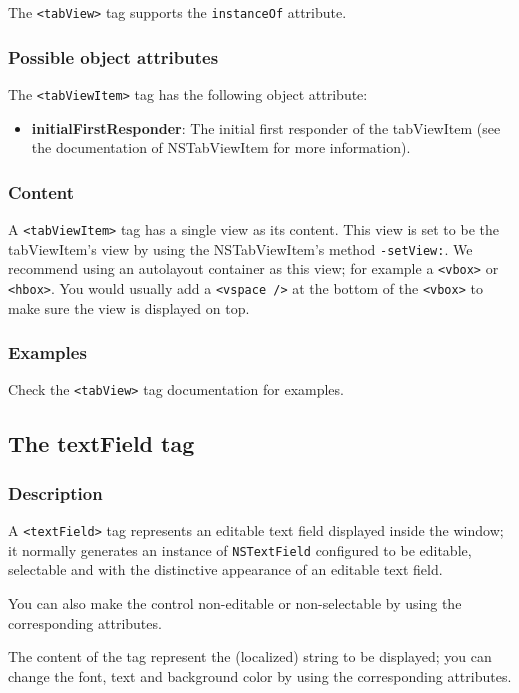 The \texttt{<tabView>} tag supports the \texttt{instanceOf} attribute.

\subsubsection{Possible object attributes}
The \texttt{<tabViewItem>} tag has the following object attribute:
\begin{itemize}
\item {\bf initialFirstResponder}: The initial first responder of the
  tabViewItem (see the documentation of NSTabViewItem for more
  information).
\end{itemize}

\subsubsection{Content}
A \texttt{<tabViewItem>} tag has a single view as its content.  This
view is set to be the tabViewItem's view by using the NSTabViewItem's
method \texttt{-setView:}.  We recommend using an autolayout container
as this view; for example a \texttt{<vbox>} or \texttt{<hbox>}.  You
would usually add a \texttt{<vspace />} at the bottom of the
\texttt{<vbox>} to make sure the view is displayed on top.

\subsubsection{Examples}
Check the \texttt{<tabView>} tag documentation for examples.

\subsection{The textField tag}

\subsubsection{Description}
A \texttt{<textField>} tag represents an editable text field displayed
inside the window; it normally generates an instance of
\texttt{NSTextField} configured to be editable, selectable and with
the distinctive appearance of an editable text field.

You can also make the control non-editable or non-selectable by using
the corresponding attributes.

The content of the tag represent the (localized) string to be
displayed; you can change the font, text and background color by using
the corresponding attributes.

